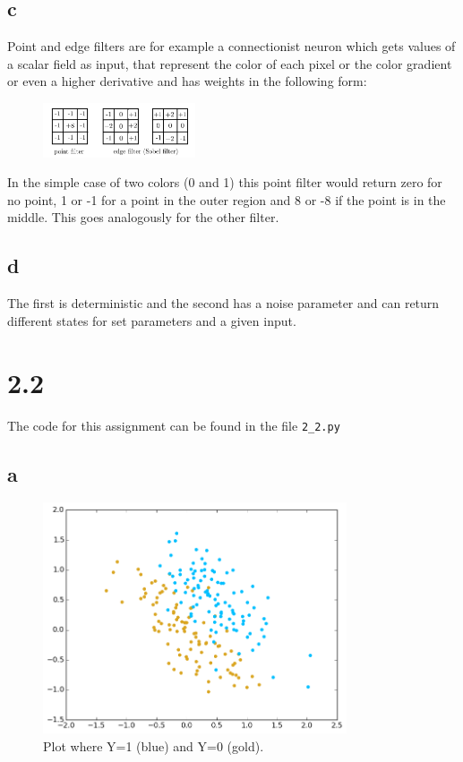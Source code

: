 \documentclass[11pt,a4paper]{article}
\begin{document}
\subsection*{c}
Point and edge filters are for example a connectionist neuron which gets values of a scalar field as input, that
represent the color of each pixel or the color gradient or even a higher derivative and has weights in the following form:
\begin{figure}[h]
\centering
 \includegraphics[width=0.4\textwidth]{./point_edge.png}
\end{figure}
In the simple case of two colors (0 and 1) this point filter would return zero for no point, 1 or -1 for a point in the outer
region and 8 or -8 if the point is in the middle. This goes analogously for the other filter.
\subsection*{d}
The first is deterministic and the second has a noise parameter and can return different states for set parameters and a given
input.
\section*{2.2}
The code for this assignment can be found in the file \verb|2_2.py|
\subsection*{a}
\begin{figure}[h]
\centering
 \includegraphics[width=0.8\textwidth]{./2_2_a.png}
\caption{Plot where Y=1 (blue) and Y=0 (gold).}
\end{figure}
\newpage
\end{document}
